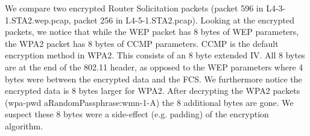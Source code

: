We compare two encrypted Router Solicitation packets (packet 596 in L4-3-1.STA2.wep.pcap, packet 256 in L4-5-1.STA2.pcap). Looking at the encrypted packets, we notice that while the WEP packet has 8 bytes of WEP parameters, the WPA2 packet has 8 bytes of CCMP parameters. CCMP is the default encryption method in WPA2. This consists of an 8 byte extended IV. All 8 bytes are at the end of the 802.11 header, as opposed to the WEP parameters where 4 bytes were between the encrypted data and the FCS. We furthermore notice the encrypted data is 8 bytes larger for WPA2. After decrypting the WPA2 packets (wpa-pwd aRandomPassphrase:wmn-1-A) the 8 additional bytes are gone. We suspect these 8 bytes were a side-effect (e.g. padding) of the encryption algorithm.
